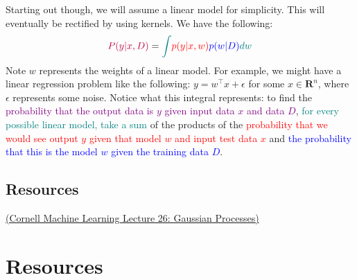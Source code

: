 \documentclass[answers,12pt]{exam}
\begin{document}
Starting out though, we will assume a linear model for simplicity. 
This will eventually be rectified by using kernels.
We have the following:
\[
    \begin{aligned}
        \textcolor{purple}{P(y|x,D)} = \textcolor{teal}{\int} \textcolor{red}{p(y|x,w)}\textcolor{blue}{p(w|D)}\textcolor{teal}{dw}
    \end{aligned}
\]
Note $w$ represents the weights of a linear model. 
For example, we might have a linear regression problem like the following: $y = w^{\top}x + \epsilon$ for some $x \in \mathbf{R}^n$, where $\epsilon$ represents some noise.
Notice what this integral represents: 
to find the \textcolor{purple}{probability that the output data is $y$ given input data $x$ and data $D$}, \textcolor{teal}{for every possible linear model, take a sum} of the products of the \textcolor{red}{probability that we would see output $y$ given that model $w$ and input test data $x$} and \textcolor{blue}{the probability that this is the model $w$ given the training data $D$}.


\subsection{Resources} 
\href{https://www.cs.cornell.edu/courses/cs4780/2018fa/lectures/lecturenote15.html}{(Cornell Machine Learning Lecture 26: Gaussian Processes)}

\section{Resources}
\end{document}
